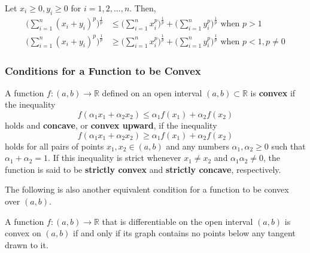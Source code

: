   \begin{lemma}
    Let $x_i \geq 0, y_i \geq 0$ for $i = 1, 2, ... ,n$. Then, 
    \begin{align*}
        \bigg( \sum_{i=1}^n (x_i + y_i)^p \bigg)^{\frac{1}{p}} & \leq \bigg( \sum_{i=1}^n x_i^p \bigg)^\frac{1}{p} + \bigg( \sum_{i=1}^n y_i^p \bigg)^{\frac{1}{p}} \text{  when } p > 1 \\
        \bigg( \sum_{i=1}^n (x_i + y_i)^p \bigg)^{\frac{1}{p}} & \geq \bigg( \sum_{i=1}^n x_i^p \bigg)^\frac{1}{p} + \bigg( \sum_{i=1}^n y_i^p \bigg)^{\frac{1}{p}} \text{  when } p < 1, p \neq 0
    \end{align*}
  \end{lemma}

  \subsubsection{Conditions for a Function to be Convex}
  \begin{definition}
    A function $f: (a, b) \longrightarrow \mathbb{R}$ defined on an open interval $(a, b) \subset \mathbb{R}$ is \textbf{convex} if the inequality
    \[f( \alpha_1 x_1 + \alpha_2 x_2) \leq \alpha_1 f(x_1) + \alpha_2 f(x_2)\]
    holds and \textbf{concave}, or \textbf{convex upward}, if the inequality 
    \[f( \alpha_1 x_1 + \alpha_2 x_2) \geq \alpha_1 f(x_1) + \alpha_2 f(x_2)\]
    holds for all pairs of points $x_1, x_2 \in (a, b)$ and any numbers $\alpha_1, \alpha_2 \geq 0$ such that $\alpha_1 + \alpha_2 = 1$. If this inequality is strict whenever $x_1 \neq x_2$ and $\alpha_1 \alpha_2 \neq 0$, the function is said to be \textbf{strictly convex} and \textbf{strictly concave}, respectively. 
  \end{definition}

  The following is also another equivalent condition for a function to be convex over $(a, b)$. 

  \begin{proposition}
    A function $f: (a, b) \longrightarrow \mathbb{R}$ that is differentiable on the open interval $(a, b)$ is convex on $(a, b)$ if and only if its graph contains no points below any tangent drawn to it.
  \end{proposition}

